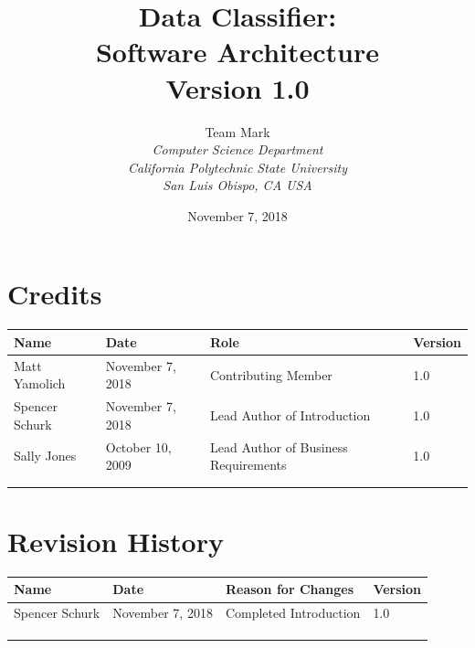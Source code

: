 \documentclass[12pt,oneside,letterpaper]{article}
\begin{document}
\title{\bfseries Data Classifier: \\
Software Architecture\\
Version 1.0}

\author {
\large{Team Mark}\\
\emph{Computer Science Department}\\
\emph{California Polytechnic State University}\\
\emph{San Luis Obispo, CA USA}\\
}

\date{November 7, 2018}
\maketitle \thispagestyle{empty}

\pagebreak
\tableofcontents



\section*{Credits}
\begin{tabular}{|l|l|p{2.5in}|l|}
\hline
\textbf{Name}&\textbf{Date}&\textbf{Role}&\textbf{Version}\\
\hline
Matt Yamolich &November 7, 2018&Contributing Member&1.0\\
\hline
Spencer Schurk&November 7, 2018&Lead Author of Introduction&1.0\\
\hline
Sally Jones&October 10, 2009&Lead Author of Business Requirements&1.0\\
\hline
&&&\\
\hline
&&&\\
\hline
\end{tabular}

\section*{Revision History}
\begin{tabular}{|l|l|p{2.5in}|l|}
\hline
\textbf{Name}&\textbf{Date}&\textbf{Reason for Changes}&\textbf{Version}\\
\hline
Spencer Schurk&November 7, 2018&Completed Introduction&1.0\\
\hline
&&&\\
\hline
&&&\\
\hline
&&&\\
\hline
\end{tabular}
\end{document}
